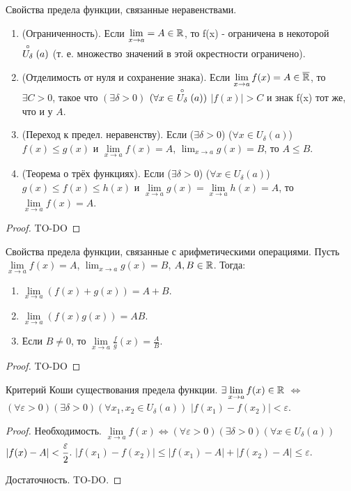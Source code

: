 \begin{theorem}{Свойства предела функции, связанные неравенствами.}
	\begin{enumerate}
		\item (Ограниченность). Если $\lim\limits_{x \to a} = A \in \mathbb{R}$, то f(x) - ограничена в некоторой $\stackrel{\circ}{U_\delta}(a)$ (т. е. множество значений в этой окрестности ограничено).
		\item (Отделимость от нуля и сохранение знака). Если $\lim\limits_{x \to a} f(x) = A \in \overline{\mathbb{R}}$, то $\exists C > 0$, такое что $(\exists \delta > 0)$ $(\forall x \in \ \stackrel{\circ}{U_\delta}(a))$ $|f(x)| > C$ и знак f(x) тот же, что и у $A$.
		\item (Переход к предел. неравенству). Если ($\exists \delta > 0$) ($\forall x \in U_\delta(a)$) $f(x) \le g(x)$ и $\lim\limits_{x \to a} f(x) = A$, $\lim_{x \to a} g(x) = B$, то $A \le B$.
		\item (Теорема о трёх функциях). Если ($\exists \delta > 0$) ($\forall x \in U_\delta(a)$) $g(x) \le f(x) \le h(x)$ и $\lim\limits_{x \to a} g(x) = \lim\limits_{x \to a} h(x) = A$, то $\lim\limits_{x \to a} f(x) = A$.
	\end{enumerate}
\end{theorem}
\begin{proof}
	TO-DO
\end{proof}

\begin{theorem}{Свойства предела функции, связанные с арифметическими операциями.}
	Пусть $\lim\limits_{x \to a} f(x) = A$, $\lim_{x \to a} g(x) = B$, $A, B \in \mathbb{R}$. Тогда:
	\begin{enumerate}
		\item $\lim\limits_{x \to a} (f(x) + g(x)) = A + B$.
		\item $\lim\limits_{x \to a} (f(x)g(x)) = AB$.
		\item Если $B \neq 0$, то $\lim\limits_{x \to a} \frac{f}{g}(x) = \frac{A}{B}$.
	\end{enumerate} 
\end{theorem}
\begin{proof}
	TO-DO
\end{proof}

\begin{theorem}{Критерий Коши существования предела функции.}
	$\exists \lim\limits_{x \to a} f(x) \in \mathbb{R}$ $\Leftrightarrow$ $(\forall \varepsilon > 0) (\exists \delta > 0) (\forall x_1, x_2 \in U_\delta(a))$ $|f(x_1) - f(x_2)| < \varepsilon$.
\end{theorem}
\begin{proof}
	Необходимость. $\lim\limits_{x \to a} f(x) \Leftrightarrow (\forall \varepsilon > 0) (\exists \delta > 0) (\forall x \in U_\delta(a))$ $|f(x) - A| < \cfrac{\varepsilon}{2}$. $|f(x_1) - f(x_2)| \le |f(x_1) - A| + |f(x_2) - A| \le \varepsilon$.
	
	Достаточность. TO-DO.
\end{proof}